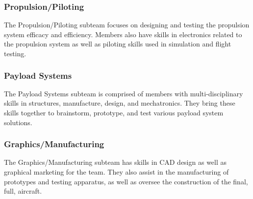 \subsubsection{Propulsion/Piloting} The Propulsion/Piloting subteam focuses on designing and testing the propulsion system efficacy and efficiency. Members also have skills in electronics related to the propulsion system as well as piloting skills used in simulation and flight testing.
\subsubsection{Payload Systems} The Payload Systems subteam is comprised of members with multi-disciplinary skills in structures, manufacture, design, and mechatronics. They bring these skills together to brainstorm, prototype, and test various payload system solutions.
\subsubsection{Graphics/Manufacturing} The Graphics/Manufacturing subteam has skills in CAD design as well as graphical marketing for the team. They also assist in the manufacturing of prototypes and testing apparatus, as well as oversee the construction of the final, full, aircraft.